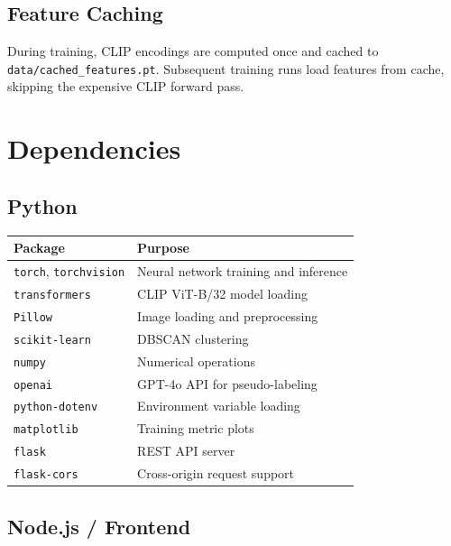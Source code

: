 \documentclass[11pt,a4paper]{article}
\begin{document}
\subsection{Feature Caching}

During training, CLIP encodings are computed once and cached to \texttt{data/cached\_features.pt}. Subsequent training runs load features from cache, skipping the expensive CLIP forward pass.

\newpage
\section{Dependencies}

\subsection{Python}

\begin{table}[H]
\centering
\begin{tabular}{ll}
\toprule
\textbf{Package} & \textbf{Purpose} \\
\midrule
\texttt{torch}, \texttt{torchvision} & Neural network training and inference \\
\texttt{transformers} & CLIP ViT-B/32 model loading \\
\texttt{Pillow} & Image loading and preprocessing \\
\texttt{scikit-learn} & DBSCAN clustering \\
\texttt{numpy} & Numerical operations \\
\texttt{openai} & GPT-4o API for pseudo-labeling \\
\texttt{python-dotenv} & Environment variable loading \\
\texttt{matplotlib} & Training metric plots \\
\texttt{flask} & REST API server \\
\texttt{flask-cors} & Cross-origin request support \\
\bottomrule
\end{tabular}
\end{table}

\subsection{Node.js / Frontend}
\end{document}
